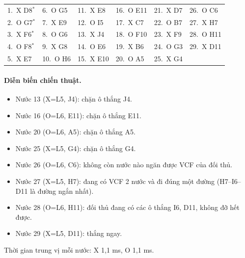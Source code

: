 {\footnotesize\linespread{1}\selectfont
\noindent\begin{tabularx}{\linewidth}{*{6}{X}}
\toprule
1.~X D8$^\ast$ & 6.~O G5 & 11.~X E8 & 16.~O E11 & 21.~X D7 & 26.~O C6 \\
2.~O G7$^\ast$ & 7.~X E9 & 12.~O I5 & 17.~X C7 & 22.~O B7 & 27.~X H7 \\
3.~X F6$^\ast$ & 8.~O G6 & 13.~X J4 & 18.~O F10 & 23.~X F9 & 28.~O H11 \\
4.~O F8$^\ast$ & 9.~X G8 & 14.~O E6 & 19.~X B6 & 24.~O G3 & 29.~X D11 \\
5.~X E7 & 10.~O H6 & 15.~X E10 & 20.~O A5 & 25.~X G4 &  \\
\bottomrule
\end{tabularx}\par}
\paragraph{Diễn biến chiến thuật.}
\begin{itemize}\small
\setlength{\itemsep}{0pt}
  \item Nước 13 (X=L5, J4): chặn ô thắng J4.
  \item Nước 16 (O=L6, E11): chặn ô thắng E11.
  \item Nước 20 (O=L6, A5): chặn ô thắng A5.
  \item Nước 25 (X=L5, G4): chặn ô thắng G4.
  \item Nước 26 (O=L6, C6): không còn nước nào ngăn được VCF của đối thủ.
  \item Nước 27 (X=L5, H7): đang có VCF 2 nước và đi đúng một đường (H7--I6--D11 là đường ngắn nhất).
  \item Nước 28 (O=L6, H11): đối thủ đang có các ô thắng I6, D11, không đỡ hết được.
  \item Nước 29 (X=L5, D11): thắng ngay.
\end{itemize}
Thời gian trung vị mỗi nước: X 1,1 ms, O 1,1 ms.
\clearpage

